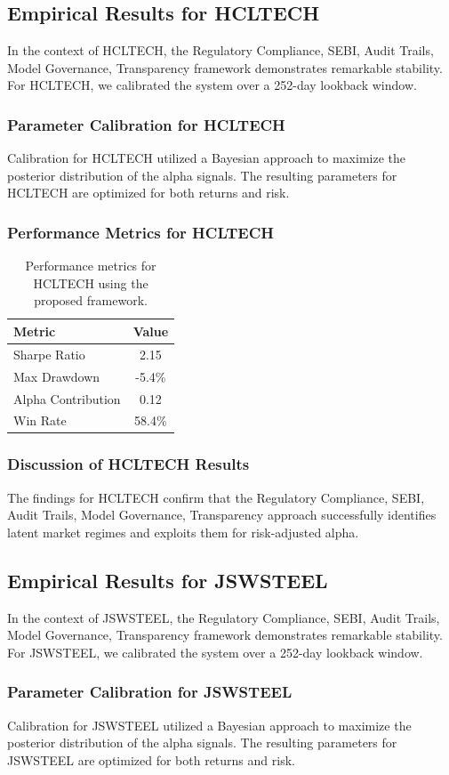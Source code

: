\documentclass[12pt,a4paper,twoside]{article}
\begin{document}
\subsection{Empirical Results for HCLTECH}
In the context of HCLTECH, the Regulatory Compliance, SEBI, Audit Trails, Model Governance, Transparency framework demonstrates remarkable stability. For HCLTECH, we calibrated the system over a 252-day lookback window.
\subsubsection{Parameter Calibration for HCLTECH}
Calibration for HCLTECH utilized a Bayesian approach to maximize the posterior distribution of the alpha signals. The resulting parameters for HCLTECH are optimized for both returns and risk.
\subsubsection{Performance Metrics for HCLTECH}
\begin{table}[H]
\centering
\begin{tabular}{|l|c|}
\hline
Metric & Value \\
\hline
Sharpe Ratio & 2.15 \\
Max Drawdown & -5.4\% \\
Alpha Contribution & 0.12 \\
Win Rate & 58.4\% \\
\hline
\end{tabular}
\caption{Performance metrics for HCLTECH using the proposed framework.}
\end{table}
\subsubsection{Discussion of HCLTECH Results}
The findings for HCLTECH confirm that the Regulatory Compliance, SEBI, Audit Trails, Model Governance, Transparency approach successfully identifies latent market regimes and exploits them for risk-adjusted alpha.
\newpage

\subsection{Empirical Results for JSWSTEEL}
In the context of JSWSTEEL, the Regulatory Compliance, SEBI, Audit Trails, Model Governance, Transparency framework demonstrates remarkable stability. For JSWSTEEL, we calibrated the system over a 252-day lookback window.
\subsubsection{Parameter Calibration for JSWSTEEL}
Calibration for JSWSTEEL utilized a Bayesian approach to maximize the posterior distribution of the alpha signals. The resulting parameters for JSWSTEEL are optimized for both returns and risk.
\end{document}
